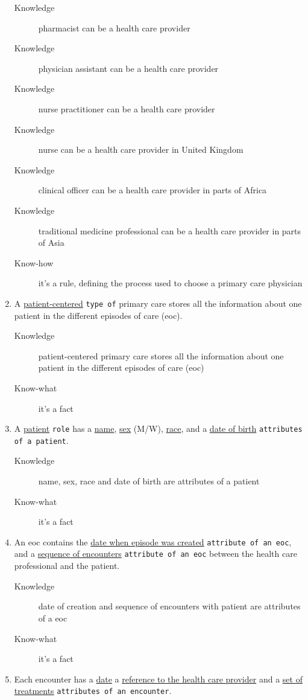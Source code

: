 \documentclass[a4paper,10pt,twoside,twocolumn]{article}
\begin{document}
\begin{enumerate}
\begin{description}
\item[{Knowledge}] pharmacist can be a health care provider
\item[{Knowledge}] physician assistant can be a health care provider
\item[{Knowledge}] nurse practitioner can be a health care provider
\item[{Knowledge}] nurse can be a health care provider in United Kingdom
\item[{Knowledge}] clinical officer can be a health care provider in parts of Africa
\item[{Knowledge}] traditional medicine professional can be a health care provider in parts of Asia
\item[{Know-how}] it's a rule, defining the process used to choose a primary care physician
\end{description}
\item A \uline{patient-centered} \texttt{type of} primary care stores all the information about one patient in the different episodes of care (eoc).
\begin{description}
\item[{Knowledge}] patient-centered primary care stores all the information about one patient in the different episodes of care (eoc)
\item[{Know-what}] it's a fact
\end{description}
\item A \uline{patient} \texttt{role} has a \uline{name}, \uline{sex} (M/W), \uline{race}, and a \uline{date of birth} \texttt{attributes of a patient}.
\begin{description}
\item[{Knowledge}] name, sex, race and date of birth are attributes of a patient
\item[{Know-what}] it's a fact
\end{description}
\item An eoc contains the \uline{date when episode was created} \texttt{attribute of an eoc}, and a \uline{sequence of encounters} \texttt{attribute of an eoc} between the health care professional and the patient.
\begin{description}
\item[{Knowledge}] date of creation and sequence of encounters with patient are attributes of a eoc
\item[{Know-what}] it's a fact
\end{description}
\item Each encounter has a \uline{date} a \uline{reference to the health care provider} and a \uline{set of treatments} \texttt{attributes of an encounter}.

\end{enumerate}
\end{document}
